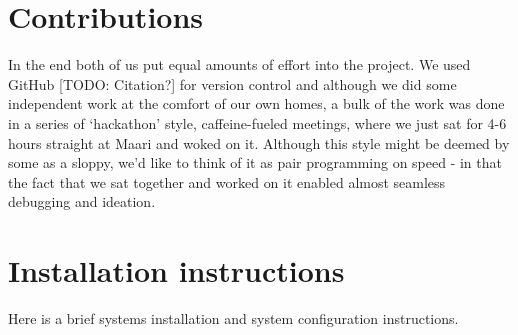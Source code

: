 
\section{Contributions}
In the end both of us put equal amounts of effort into the project. 
We used GitHub [TODO: Citation?] for version control and although we did
some independent work at the comfort of our own homes, a bulk of the work
was done in a series of \lq hackathon' style, caffeine-fueled meetings, where we just sat
for 4-6 hours straight at Maari and woked on it. Although this style might be deemed by some
as a sloppy, we'd like to think of it as pair programming on speed - in that 
the fact that we sat together and worked on it enabled almost seamless debugging
and ideation.\\




\clearpage

\nocite{*}




\clearpage
\appendix
\section{Installation instructions} \label{App:instructions}

Here is a brief systems installation and system configuration instructions. 

